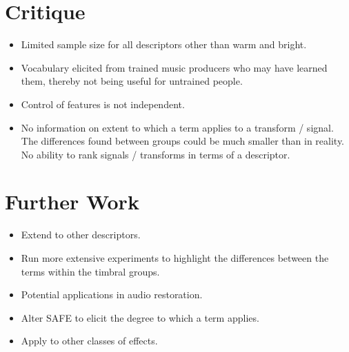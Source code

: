 \section{Critique}
\label{sec:Conclusion-Critique}
	\note
	{
		\begin{itemize}
			\item Limited sample size for all descriptors other than warm and bright.
			\item Vocabulary elicited from trained music producers who may have learned them, thereby not being
				useful for untrained people.
			\item Control of features is not independent.
			\item No information on extent to which a term applies to a transform / signal. The differences
				found between groups could be much smaller than in reality. No ability to rank signals /
				transforms in terms of a descriptor.
		\end{itemize}
	}

\section{Further Work}
\label{sec:Conclusion-FurtherWork}
	\note
	{
		\begin{itemize}
			\item Extend to other descriptors.
			\item Run more extensive experiments to highlight the differences between the terms within the
				timbral groups.
			\item Potential applications in audio restoration.
			\item Alter SAFE to elicit the degree to which a term applies.
			\item Apply to other classes of effects.
		\end{itemize}
	}

